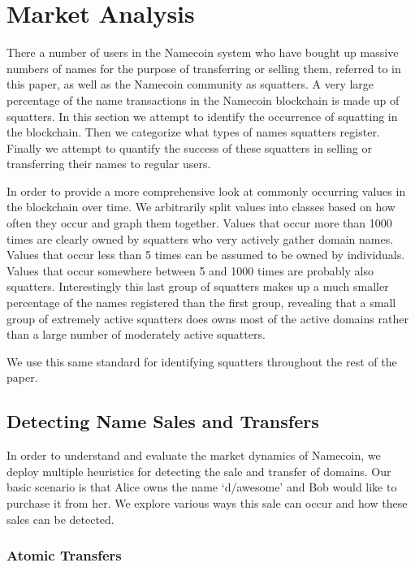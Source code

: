 \section{Market Analysis}
\label{sec:methods}

There a number of users in the Namecoin system who have bought up massive numbers of names for the purpose of transferring or selling them, referred to in this paper, as well as the Namecoin community as squatters. A very large percentage of the name transactions in the Namecoin blockchain is made up of squatters. In this section we attempt to identify the occurrence of squatting in the blockchain. Then we categorize what types of names squatters register. Finally we attempt to quantify the success of these squatters in selling or transferring their names to regular users.
\label{sec:methods}

In order to provide a more comprehensive look at commonly occurring values in the blockchain over time. We arbitrarily split values into classes based on how often they occur and graph them together. Values that occur more than 1000 times are clearly owned by squatters who very actively gather domain names. Values that occur less than 5 times can be assumed to be owned by individuals. Values that occur somewhere between 5 and 1000 times are probably also squatters. Interestingly this last group of squatters makes up a much smaller percentage of the names registered than the first group, revealing that a small group of extremely active squatters does owns most of the active domains rather than a large number of moderately active squatters.

We use this same standard for identifying squatters throughout the rest of the paper.

\subsection{Detecting Name Sales and Transfers}

In order to understand and evaluate the market dynamics of Namecoin, we deploy multiple heuristics for detecting the sale and transfer of domains. Our basic scenario is that Alice owns the name `d/awesome' and Bob would like to purchase it from her. We explore various ways this sale can occur and how these sales can be detected.

\subsubsection{Atomic Transfers}

